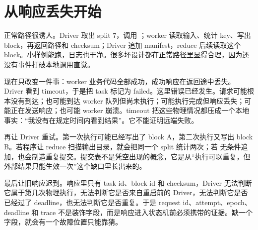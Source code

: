 \section{从响应丢失开始}

正常路径很诱人。Driver 取出 split 7，调用 ；worker 读取输入、统计 key、写出 block，再返回路径和 checksum；Driver 追加 manifest，reduce 后续读取这个 block。小样例能跑，日志也干净。很多坏设计都在正常路径里显得合理，因为还没有事件打破本地调用直觉。

现在只改变一件事：worker 业务代码全部成功，成功响应在返回途中丢失。Driver 看到 timeout，于是把 task 标记为 failed。这里错误已经发生。请求可能根本没有到达；也可能到达 worker 队列但尚未执行；可能执行完成但响应丢失；可能正在发送响应；也可能 worker 崩溃。timeout 把这些物理情况都压成一个本地事实：“我没有在规定时间内看到结果”。它不能证明远端失败。

再让 Driver 重试。第一次执行可能已经写出了 block A，第二次执行又写出 block B。若程序让 reduce 扫描输出目录，就会把同一个 split 统计两次；若  无条件追加，也会制造重复提交。提交表不是凭空出现的概念，它是从“执行可以重复，但外部结果只能生效一次”这个缺口里长出来的。

最后让旧响应迟到。响应里只有 task id、block id 和 checksum，Driver 无法判断它属于第几次物理执行，无法判断它是否来自重启前的 Driver，无法判断它是否已经过了 deadline，也无法判断它是否重复。于是 request id、attempt、epoch、deadline 和 trace 不是装饰字段，而是响应进入状态机前必须携带的证据。缺一个字段，就会有一个故障位置只能靠猜。

